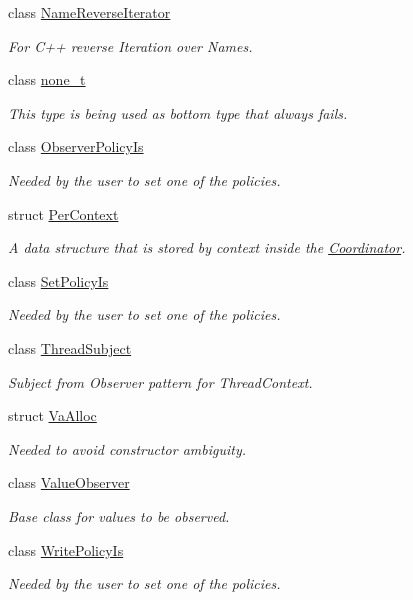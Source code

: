 \begin{DoxyCompactItemize}
class \hyperlink{classkdb_1_1NameReverseIterator}{Name\+Reverse\+Iterator}
\begin{DoxyCompactList}\small\item\em For C++ reverse Iteration over Names. \end{DoxyCompactList}\item 
class \hyperlink{classkdb_1_1none__t}{none\+\_\+t}
\begin{DoxyCompactList}\small\item\em This type is being used as bottom type that always fails. \end{DoxyCompactList}\item 
class \hyperlink{classkdb_1_1ObserverPolicyIs}{Observer\+Policy\+Is}
\begin{DoxyCompactList}\small\item\em Needed by the user to set one of the policies. \end{DoxyCompactList}\item 
struct \hyperlink{structkdb_1_1PerContext}{Per\+Context}
\begin{DoxyCompactList}\small\item\em A data structure that is stored by context inside the \hyperlink{classkdb_1_1Coordinator}{Coordinator}. \end{DoxyCompactList}\item 
class \hyperlink{classkdb_1_1SetPolicyIs}{Set\+Policy\+Is}
\begin{DoxyCompactList}\small\item\em Needed by the user to set one of the policies. \end{DoxyCompactList}\item 
class \hyperlink{classkdb_1_1ThreadSubject}{Thread\+Subject}
\begin{DoxyCompactList}\small\item\em Subject from Observer pattern for Thread\+Context. \end{DoxyCompactList}\item 
struct \hyperlink{structkdb_1_1VaAlloc}{Va\+Alloc}
\begin{DoxyCompactList}\small\item\em Needed to avoid constructor ambiguity. \end{DoxyCompactList}\item 
class \hyperlink{classkdb_1_1ValueObserver}{Value\+Observer}
\begin{DoxyCompactList}\small\item\em Base class for values to be observed. \end{DoxyCompactList}\item 
class \hyperlink{classkdb_1_1WritePolicyIs}{Write\+Policy\+Is}
\begin{DoxyCompactList}\small\item\em Needed by the user to set one of the policies. \end{DoxyCompactList}\end{DoxyCompactItemize}
